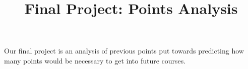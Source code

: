 
    \title{Final Project: Points Analysis}
    \maketitle


    Our final project is an analysis of previous points put towards predicting how many points would be necessary to get into future courses.
